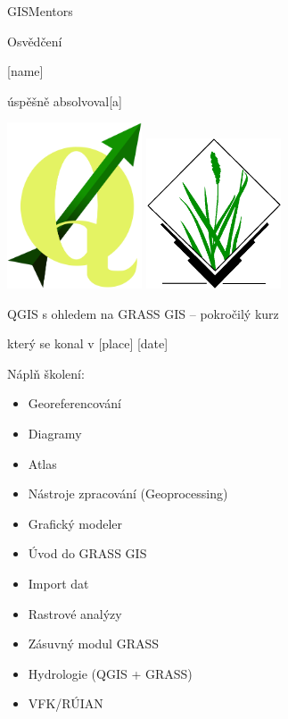\documentclass[12pt, a4paper]{letter}
\begin{document}
\pagestyle{empty}
\begin{center}

{\Large GISMentors}

{\Huge Osvědčení}

{\Large [name]}

úspěšně absolvoval[a]

\includegraphics[width=0.30\textwidth]{../images/qgislogo_vector.eps}
\includegraphics[width=0.30\textwidth]{../images/grasslogo_vector.eps}

{\Large QGIS s ohledem na GRASS GIS -- pokročilý kurz}

který se konal v [place] [date]
\end{center}

Náplň školení:

\begin{multicols}{2}
\begin{itemize}
        \item Georeferencování
        \item Diagramy
        \item Atlas
        \item Nástroje zpracování (Geoprocessing)
        \item Grafický modeler
\end{itemize}
\columnbreak
\begin{itemize}
        \item Úvod do GRASS GIS
        \item Import dat
        \item Rastrové analýzy
        \item Zásuvný modul GRASS
        \item Hydrologie (QGIS + GRASS)
        \item VFK/RÚIAN
\end{itemize}
\end{multicols}
\end{document}
